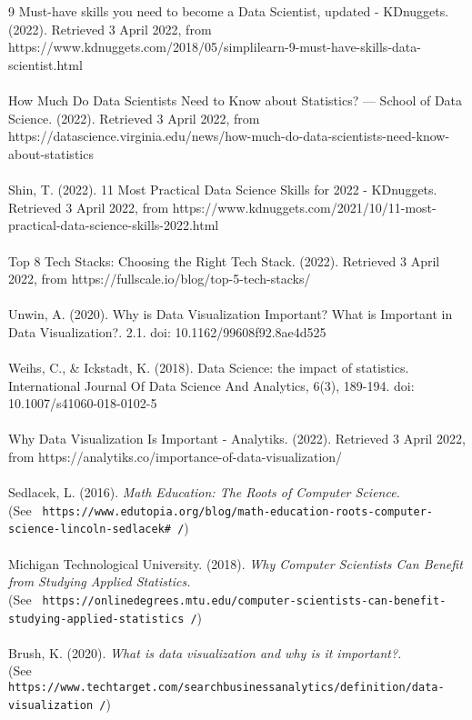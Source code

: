 \documentclass[a4paper, 11pt]{report}
\begin{document}
	\\
	\\
	9 Must-have skills you need to become a Data Scientist, updated - KDnuggets. (2022). Retrieved 3 April 2022, from https://www.kdnuggets.com/2018/05/simplilearn-9-must-have-skills-data-scientist.html
	\\
	\\
	How Much Do Data Scientists Need to Know about Statistics? — School of Data Science. (2022). Retrieved 3 April 2022, from https://datascience.virginia.edu/news/how-much-do-data-scientists-need-know-about-statistics
	\\
	\\
	Shin, T. (2022). 11 Most Practical Data Science Skills for 2022 - KDnuggets. Retrieved 3 April 2022, from https://www.kdnuggets.com/2021/10/11-most-practical-data-science-skills-2022.html
	\\
	\\
	Top 8 Tech Stacks: Choosing the Right Tech Stack. (2022). Retrieved 3 April 2022, from https://fullscale.io/blog/top-5-tech-stacks/
	\\
	\\
	Unwin, A. (2020). Why is Data Visualization Important? What is Important in Data Visualization?. 2.1. doi: 10.1162/99608f92.8ae4d525
	\\
	\\
	Weihs, C., \& Ickstadt, K. (2018). Data Science: the impact of statistics. International Journal Of Data Science And Analytics, 6(3), 189-194. doi: 10.1007/s41060-018-0102-5
	\\
	\\
	Why Data Visualization Is Important - Analytiks. (2022). Retrieved 3 April 2022, from https://analytiks.co/importance-of-data-visualization/
	\\
	\\
	Sedlacek, L. (2016). \textit{ Math Education: The Roots of Computer Science.} \\(See \texttt{ https://www.edutopia.org/blog/math-education-roots-computer-science-lincoln-sedlacek# /})
	\\
	\\
	Michigan Technological University. (2018). \textit{ Why Computer Scientists Can Benefit from Studying Applied Statistics.}\\ (See \texttt{ https://onlinedegrees.mtu.edu/computer-scientists-can-benefit-studying-applied-statistics /})
	\\
	\\
	Brush, K. (2020). \textit{ What is data visualization and why is it important?.} \\(See \texttt{ https://www.techtarget.com/searchbusinessanalytics/definition/data-visualization /})
\end{document}
